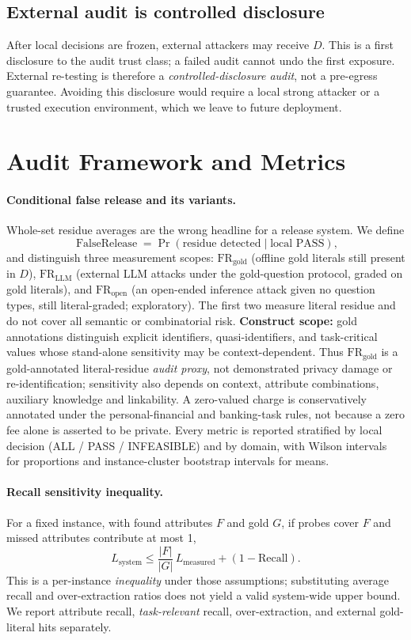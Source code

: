 \documentclass[11pt,a4paper]{article}
\begin{document}
\subsection{External audit is controlled disclosure}
After local decisions are frozen, external attackers may receive $D$. This is a first disclosure to the audit trust class; a failed audit cannot undo the first exposure. External re-testing is therefore a \emph{controlled-disclosure audit}, not a pre-egress guarantee. Avoiding this disclosure would require a local strong attacker or a trusted execution environment, which we leave to future deployment.

\section{Audit Framework and Metrics}\label{sec:framework}

\paragraph{Conditional false release and its variants.} Whole-set residue averages are the wrong headline for a release system. We define
\[
\operatorname{FalseRelease}=\Pr(\text{residue detected}\mid\text{local PASS}),
\]
and distinguish three measurement scopes: $\mathrm{FR}_{\mathrm{gold}}$ (offline gold literals still present in $D$), $\mathrm{FR}_{\mathrm{LLM}}$ (external LLM attacks under the gold-question protocol, graded on gold literals), and $\mathrm{FR}_{\mathrm{open}}$ (an open-ended inference attack given no question types, still literal-graded; exploratory). The first two measure literal residue and do not cover all semantic or combinatorial risk. \textbf{Construct scope:} gold annotations distinguish explicit identifiers, quasi-identifiers, and task-critical values whose stand-alone sensitivity may be context-dependent. Thus $\mathrm{FR}_{\mathrm{gold}}$ is a gold-annotated literal-residue \emph{audit proxy}, not demonstrated privacy damage or re-identification; sensitivity also depends on context, attribute combinations, auxiliary knowledge and linkability. A zero-valued charge is conservatively annotated under the personal-financial and banking-task rules, not because a zero fee alone is asserted to be private. Every metric is reported stratified by local decision (ALL / PASS / INFEASIBLE) and by domain, with Wilson intervals~\cite{wilson1927} for proportions and instance-cluster bootstrap intervals for means.

\paragraph{Recall sensitivity inequality.} For a fixed instance, with found attributes $F$ and gold $G$, if probes cover $F$ and missed attributes contribute at most 1,
\[
L_{\mathrm{system}}\le \frac{|F|}{|G|}\,L_{\mathrm{measured}}+(1-\mathrm{Recall}).
\]
This is a per-instance \emph{inequality} under those assumptions; substituting average recall and over-extraction ratios does not yield a valid system-wide upper bound. We report attribute recall, \emph{task-relevant} recall, over-extraction, and external gold-literal hits separately.
\end{document}
